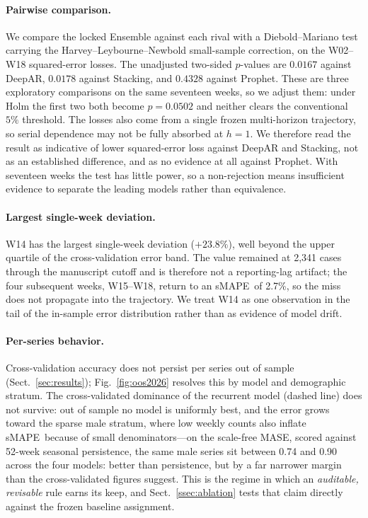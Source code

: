 \documentclass[runningheads]{llncs}
\newcommand{\smape}{sMAPE}
\newcommand{\mase}{MASE}
\begin{document}
\paragraph{Pairwise comparison.}
We compare the locked Ensemble against each rival with a
Diebold--Mariano test carrying the Harvey--Leybourne--Newbold
small-sample correction, on the W02--W18 squared-error losses. The
unadjusted two-sided $p$-values are $0.0167$ against DeepAR, $0.0178$
against Stacking, and $0.4328$ against Prophet. These are three
exploratory comparisons on the same seventeen weeks, so we adjust them:
under Holm the first two both become $p=0.0502$ and neither clears the
conventional $5\%$ threshold. The losses also come from a single frozen
multi-horizon trajectory, so serial dependence may not be fully absorbed
at $h{=}1$. We therefore read the result as indicative of lower
squared-error loss against DeepAR and Stacking, not as an established
difference, and as no evidence at all against Prophet. With seventeen weeks the test has little power, so a
non-rejection means insufficient evidence to separate the leading
models rather than equivalence.

\paragraph{Largest single-week deviation.}
W14 has the largest single-week deviation ($+23.8\%$), well beyond the
upper quartile of the cross-validation error band. The value remained
at 2{,}341 cases through the manuscript cutoff and is therefore not a
reporting-lag artifact; the four subsequent weeks, W15--W18, return to
an \smape\ of 2.7\%, so the miss does not propagate into the
trajectory. We treat W14 as one observation in the tail of the
in-sample error distribution rather than as evidence of model drift.

\paragraph{Per-series behavior.}
Cross-validation accuracy does not persist per series out of sample
(Sect.~\ref{sec:results}); Fig.~\ref{fig:oos2026} resolves this by
model and demographic stratum. The cross-validated dominance of the
recurrent model (dashed line) does not survive: out of sample no model
is uniformly best, and the error grows toward the sparse male stratum,
where low weekly counts also inflate \smape\ because of small
denominators---on the scale-free \mase, scored against 52-week
seasonal persistence, the same male series sit between 0.74 and 0.90
across the four models: better than persistence, but by a far narrower
margin than the cross-validated figures suggest.
This is the regime in which an \emph{auditable, revisable} rule earns
its keep, and Sect.~\ref{ssec:ablation} tests that claim directly
against the frozen baseline assignment.
\end{document}
